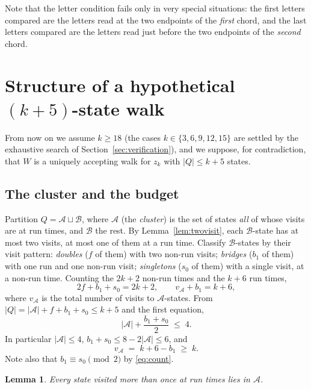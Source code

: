 \documentclass[11pt]{article}
\newtheorem{lemma}[theorem]{Lemma}
\theoremstyle{definition}
\begin{document}
Note that the letter condition fails only in very special situations: the
first letters compared are the letters read at the two endpoints of the
\emph{first} chord, and the last letters compared are the letters read just
before the two endpoints of the \emph{second} chord.

\section{Structure of a hypothetical \texorpdfstring{$(k+5)$}{k+5}-state walk}\label{sec:structure}

From now on we assume $k\ge18$ (the cases $k\in\{3,6,9,12,15\}$ are settled
by the exhaustive search of Section~\ref{sec:verification}), and we suppose,
for contradiction, that $W$ is a uniquely accepting walk for $z_k$ with
$|Q|\le k+5$ states.

\subsection{The cluster and the budget}\label{sec:budget}

Partition $Q=\mathcal A\sqcup\mathcal B$, where $\mathcal A$ (the
\emph{cluster}) is the set of states \emph{all} of whose visits are at run
times, and $\mathcal B$ the rest. By Lemma~\ref{lem:twovisit}, each
$\mathcal B$-state has at most two visits, at most one of them at a run time.
Classify $\mathcal B$-states by their visit pattern: \emph{doubles} ($f$ of
them) with two non-run visits; \emph{bridges} ($b_1$ of them) with one run and
one non-run visit; \emph{singletons} ($s_0$ of them) with a single visit, at a
non-run time. Counting the $2k+2$ non-run times and the $k+6$ run times,
\begin{equation}\label{eq:count}
2f+b_1+s_0=2k+2,
\qquad
v_{\mathcal A}+b_1=k+6,
\end{equation}
where $v_{\mathcal A}$ is the total number of visits to $\mathcal A$-states.
From $|Q|=|\mathcal A|+f+b_1+s_0\le k+5$ and the first equation,
\begin{equation}\label{eq:budget}
|\mathcal A|+\frac{b_1+s_0}{2}\;\le\;4 .
\end{equation}
In particular $|\mathcal A|\le4$, $b_1+s_0\le 8-2|\mathcal A|\le 6$, and
\begin{equation}\label{eq:vA}
v_{\mathcal A}\;=\;k+6-b_1\;\ge\;k .
\end{equation}
Note also that $b_1\equiv s_0\pmod 2$ by \eqref{eq:count}.

\begin{lemma}\label{lem:repeats-in-A}
Every state visited more than once at run times lies in $\mathcal A$.
\end{lemma}
\end{document}
